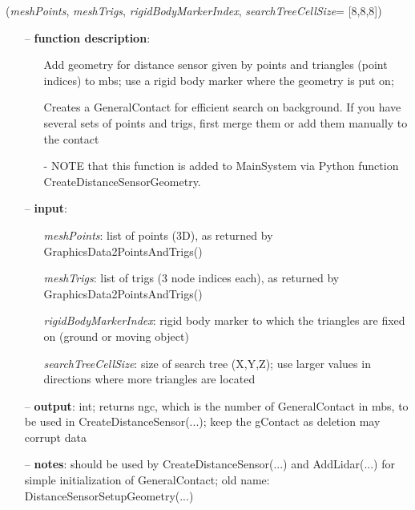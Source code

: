 %
\begin{flushleft}
\label{sec:mainsystemextensions:CreateDistanceSensorGeometry}
({\it meshPoints}, {\it meshTrigs}, {\it rigidBodyMarkerIndex}, {\it searchTreeCellSize}= [8,8,8])
\end{flushleft}
\setlength{\itemindent}{0.7cm}
\begin{itemize}[leftmargin=0.7cm]
\item[--]
{\bf function description}: \vspace{-6pt}
\begin{itemize}[leftmargin=1.2cm]
\setlength{\itemindent}{-0.7cm}
\item[]Add geometry for distance sensor given by points and triangles (point indices) to mbs; use a rigid body marker where the geometry is put on;
\item[]Creates a GeneralContact for efficient search on background. If you have several sets of points and trigs, first merge them or add them manually to the contact
\item[]- NOTE that this function is added to MainSystem via Python function CreateDistanceSensorGeometry.
\end{itemize}
\item[--]
{\bf input}: \vspace{-6pt}
\begin{itemize}[leftmargin=1.2cm]
\setlength{\itemindent}{-0.7cm}
\item[]{\it meshPoints}: list of points (3D), as returned by GraphicsData2PointsAndTrigs()
\item[]{\it meshTrigs}: list of trigs (3 node indices each), as returned by GraphicsData2PointsAndTrigs()
\item[]{\it rigidBodyMarkerIndex}: rigid body marker to which the triangles are fixed on (ground or moving object)
\item[]{\it searchTreeCellSize}: size of search tree (X,Y,Z); use larger values in directions where more triangles are located
\end{itemize}
\item[--]
{\bf output}: int; returns ngc, which is the number of GeneralContact in mbs, to be used in CreateDistanceSensor(...); keep the gContact as deletion may corrupt data
\item[--]
{\bf notes}: should be used by CreateDistanceSensor(...) and AddLidar(...) for simple initialization of GeneralContact; old name: DistanceSensorSetupGeometry(...)
\vspace{12pt}\end{itemize}
%

